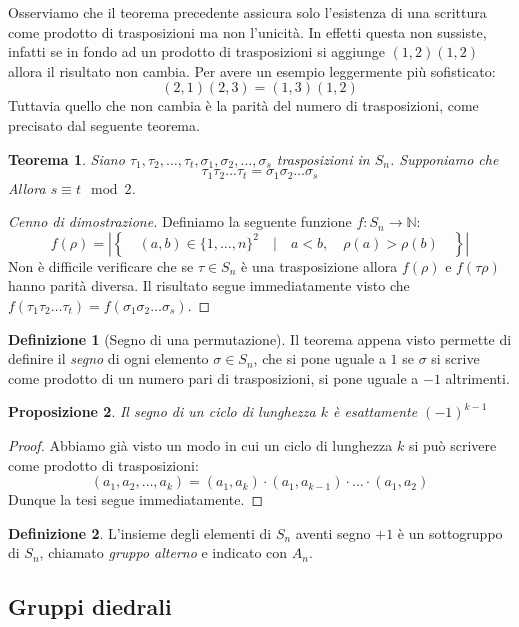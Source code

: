 \documentclass[11pt]{article}
\theoremstyle{plain}
\newtheorem{thm}{Teorema}[section]
\newtheorem{prop}[thm]{Proposizione}
\theoremstyle{definition}
\newtheorem{defn}{Definizione}[section]
\theoremstyle{remark}
\newcommand{\N}{\mathbb{N}}
\begin{document}
Osserviamo che il teorema precedente assicura solo l'esistenza di una scrittura come prodotto di trasposizioni
ma non l'unicità. In effetti questa non sussiste, infatti se in fondo ad un prodotto di trasposizioni si aggiunge $(1,2)(1,2)$
allora il risultato non cambia. Per avere un esempio leggermente più sofisticato:
\[(2,1)(2,3) = (1,3)(1,2)\]
Tuttavia quello che non cambia è la parità del numero di trasposizioni, come precisato dal seguente teorema.
\begin{thm}
Siano $\tau_1, \tau_2, \dots, \tau_t, \sigma_1, \sigma_2, \dots, \sigma_s$ trasposizioni in $S_n$. Supponiamo che
\[\tau_1\tau_2\dots\tau_t = \sigma_1\sigma_2\dots\sigma_s\]
Allora $s\equiv t \mod 2$.
\end{thm}
\begin{proof}[Cenno di dimostrazione]
Definiamo la seguente funzione $f:S_n\to\N$:
\[f(\rho) = |\left\{\quad(a,b)\in\{1,\dots,n\}^2 \quad | \quad a < b, \quad\rho(a) > \rho(b) \quad\right\}|\]
Non è difficile verificare che se $\tau\in S_n$ è una trasposizione allora $f(\rho)$ e $f(\tau\rho)$ hanno parità diversa.
Il risultato segue immediatamente visto che $f(\tau_1\tau_2\dots\tau_t) = f(\sigma_1\sigma_2\dots\sigma_s)$.
\end{proof}

\begin{defn}[Segno di una permutazione]
Il teorema appena visto permette di definire il \emph{segno} di ogni elemento $\sigma\in S_n$, che si pone uguale a $1$
se $\sigma$ si scrive come prodotto di un numero pari di trasposizioni, si pone uguale a $-1$ altrimenti.
\end{defn}

\begin{prop}
Il segno di un ciclo di lunghezza $k$ è esattamente $(-1)^{k-1}$
\end{prop}
\begin{proof}
Abbiamo già visto un modo in cui un ciclo di lunghezza $k$ si può scrivere come prodotto di trasposizioni:
\[(a_1, a_2, \dots, a_k) = (a_1, a_k)\cdot (a_1, a_{k-1}) \cdot \dots \cdot (a_1, a_2)\]
Dunque la tesi segue immediatamente.
\end{proof}

\begin{defn}
L'insieme degli elementi di $S_n$ aventi segno $+1$ è un sottogruppo di $S_n$,
chiamato \emph{gruppo alterno} e indicato con $A_n$.
\end{defn}


\subsection{Gruppi diedrali}
\end{document}
